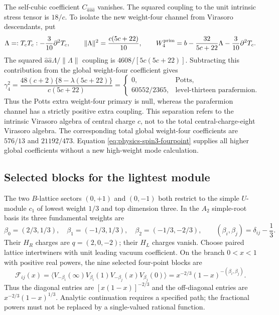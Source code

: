 \documentclass[11pt,a4paper]{article}
\theoremstyle{definition}
\begin{document}
The self-cubic coefficient $C_{\widehat a\widehat a\widehat a}$
vanishes.  The squared coupling to the unit intrinsic stress tensor is
$18/c$.  To isolate the new weight-four channel from Virasoro
descendants, put
\begin{equation}
 \Lambda=:T_cT_c:-\frac3{10}\partial^2T_c,
 \qquad \|\Lambda\|^2=\frac{c(5c+22)}{10},
 \qquad W_4^{\rm prim}
 =b-\frac{32}{5c+22}\Lambda-\frac3{10}\partial^2T_c.
\end{equation}
The squared $\widehat a\widehat a\Lambda/\|\Lambda\|$ coupling
is $4608/[5c(5c+22)]$.  Subtracting this contribution from the global
weight-four coefficient gives
\begin{equation}
 \gamma_4^2
 =\frac{48(c+2)\{8-\lambda(5c+22)\}}{c(5c+22)}
 =\begin{cases}
 0,&\text{Potts},\\
 60552/2365,&\text{level-thirteen parafermion}.
 \end{cases}
\end{equation}
Thus the Potts extra weight-four primary is null, whereas the
parafermion channel has a strictly positive extra coupling.  This
separation refers to the intrinsic Virasoro algebra of central charge
$c$, not to the total central-charge-eight Virasoro algebra.  The
corresponding total global weight-four coefficients are $576/13$ and
$21192/473$.  Equation \eqref{eq:physics-spin3-fourpoint} supplies all
higher global coefficients without a new high-weight mode calculation.

\subsection{Selected blocks for the lightest module}

The two $B$-lattice sectors $(0,+1)$ and $(0,-1)$ both restrict to the
simple $U$-module $c_1$ of lowest weight $1/3$ and top dimension three.
In the $A_2$ simple-root basis its three fundamental weights are
\begin{equation}
 \beta_0=(2/3,1/3),\quad
 \beta_1=(-1/3,1/3),\quad
 \beta_2=(-1/3,-2/3),\qquad
 (\beta_i,\beta_j)=\delta_{ij}-\frac13.
\end{equation}
Their $H_R$ charges are $q=(2,0,-2)$; their $H_L$ charges vanish.
Choose paired lattice intertwiners with unit leading vacuum coefficient.
On the branch $0<x<1$ with positive real powers, the nine selected
four-point blocks are
\begin{equation}
 \mathcal F_{ij}(x)
 =\langle V_{-\beta_i}(\infty)V_{\beta_i}(1)
           V_{-\beta_j}(x)V_{\beta_j}(0)\rangle
 =\boxed{x^{-2/3}(1-x)^{-(\beta_i,\beta_j)}}.
 \label{eq:physics-lightest-block}
\end{equation}
Thus the diagonal entries are $[x(1-x)]^{-2/3}$ and the off-diagonal
entries are $x^{-2/3}(1-x)^{1/3}$.  Analytic continuation requires a
specified path; the fractional powers must not be replaced by a
single-valued rational function.
\end{document}
